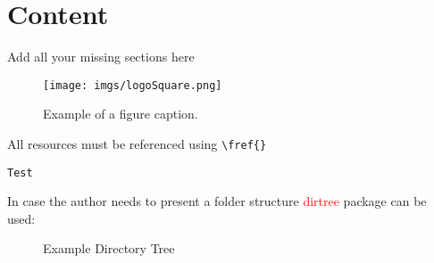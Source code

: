 
\section{Content}

Add all your missing sections here \\




\begin{figure}[!h]
\centerline{\texttt{[image: imgs/logoSquare.png]}}
\caption{Example of a figure caption.}
\label{fig:test}
\end{figure}

All resources must be referenced using \lstinline[basicstyle=\small\ttfamily]|\fref{}|


\begin{lstlisting}[caption={test},label={lst:test}]
Test
\end{lstlisting}

In case the author needs to present a folder structure \textcolor{red}{dirtree} package can be used:

\begin{figure}[h]
	\centering
	\caption{Example Directory Tree}
	\label{fig:dirtree}
\end{figure}%

